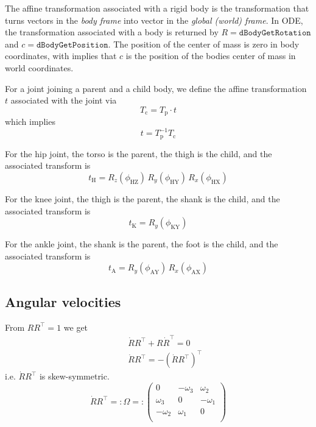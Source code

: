 \documentclass[a4paper]{article}
\begin{document}
The affine transformation associated with a rigid body is the transformation that turns vectors in the \textit{body frame} into vector in the \textit{global (world) frame}. In ODE, the transformation associated with a body is returned by $R = \mathtt{dBodyGetRotation}$ and $c = \mathtt{dBodyGetPosition}$. The position of the center of mass is zero in body coordinates, with implies that $c$ is the position of the bodies center of mass in world coordinates.

For a joint joining a parent and a child body, we define the affine transformation $t$ associated with the joint via
\begin{equation}
T_\mathrm{c} = T_\mathrm{p} \cdot t
\end{equation}
which implies
\begin{equation}
t = T_\mathrm{p}^{-1} T_\mathrm{c}
\end{equation}

For the hip joint, the torso is the parent, the thigh is the child, and the associated transform is
\begin{equation}
t_\mathrm{H} = R_z(\phi_\mathrm{HZ})\,R_y(\phi_\mathrm{HY})\,R_x(\phi_\mathrm{HX})
\end{equation}

For the knee joint, the thigh is the parent, the shank is the child, and the associated transform is
\begin{equation}
t_\mathrm{K} = R_y(\phi_\mathrm{KY})
\end{equation}

For the ankle joint, the shank is the parent, the foot is the child, and the associated transform is
\begin{equation}
t_\mathrm{A} = R_y(\phi_\mathrm{AY})\,R_x(\phi_\mathrm{AX})
\end{equation}

\subsection{Angular velocities}
From $R R^\top = 1$ we get
\begin{eqnarray}
&&\dot{R} R^\top + R \dot{R}^\top = 0\\
&&\dot{R} R^\top = -(\dot{R} R^\top)^\top
\end{eqnarray}
i.e. $\dot{R} R^\top$ is skew-symmetric.
\begin{equation}
\dot{R} R^\top =: \Omega =: \left(\begin{array}{ccc}
0 & -\omega_3 & \omega_2\\
\omega_3 & 0 & -\omega_1\\
-\omega_2 & \omega_1 & 0\\
\end{array}\right)
\end{equation}
\end{document}
